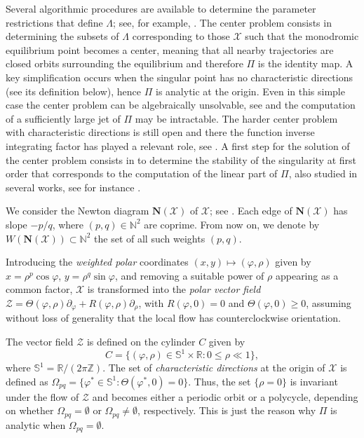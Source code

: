 \documentclass[12pt]{amsart}
\begin{document}
Several algorithmic procedures are available to determine the parameter restrictions that define $\Lambda$; see, for example, \cite{Dum, Ar, AGR,AGR2, GGGrau}. The center problem consists in determining the subsets of $\Lambda$ corresponding to those $\mathcal{X}$ such that the  monodromic equilibrium point becomes a center, meaning that all nearby trajectories are closed orbits surrounding the equilibrium and therefore $\Pi$ is the identity map. A key simplification occurs when the singular point has no characteristic directions (see its definition below), hence $\Pi$ is analytic at the origin. Even in this simple case the center problem can be algebraically  unsolvable, see \cite{ADGG,BRY,CYZ,Ga-Ma,Ilyashenko-2,G1,GM,LWX,RS,TLZ} and the computation of a sufficiently large jet of $\Pi$ may be intractable. The harder center problem with characteristic directions is still open and there the function inverse integrating factor has played a relevant role, see \cite{AGG,GaGiGr,Ga-Gi,GaGi2,GS}. A first step for the solution of the center problem consists in to determine the stability of the singularity at first order that corresponds to the computation of the linear part of $\Pi$, also studied in several works, see for instance \cite{GaGi5,Ma,Me-2,Me-3}.

We consider the Newton diagram $\mathbf{N}(\mathcal{X})$ of $\mathcal{X}$; see \cite{Bruno, AGR}. Each edge of $\mathbf{N}(\mathcal{X})$ has slope $-p/q$, where $(p,q) \in \mathbb{N}^2$ are coprime. From now on, we denote by $W(\mathbf{N}(\mathcal{X})) \subset \mathbb{N}^2$ the set of all such weights $(p,q)$.

Introducing the {\it weighted polar} coordinates $(x,y) \mapsto (\varphi, \rho)$ given by $x= \rho^p \cos\varphi$, $y = \rho^q \sin\varphi$, and removing a suitable power of $\rho$ appearing as a common factor, $\mathcal{X}$ is transformed into the {\it polar vector field} $\mathcal{Z} = \Theta(\varphi, \rho) \partial_\varphi + R(\varphi, \rho) \partial_\rho$, with
$R(\varphi, 0)=0$ and $\Theta(\varphi, 0) \geq 0$, assuming without loss of generality that the local flow has counterclockwise orientation.

The vector field $\mathcal{Z}$ is defined on the cylinder $C$ given by
\begin{equation}\label{cilinder}
C =  \{ (\varphi, \rho) \in \mathbb{S}^1 \times \mathbb{R} :  0 \leq \rho \ll 1 \},
\end{equation}
where $\mathbb{S}^1 = \mathbb{R}/ (2 \pi \mathbb{Z})$. The set of {\it characteristic directions} at the origin of $\mathcal{X}$ is defined as
$\Omega_{pq} = \{ \varphi^* \in \mathbb{S}^1 : \Theta(\varphi^*, 0) = 0 \}$. Thus, the set $\{\rho=0 \}$ is invariant under the flow of $\mathcal{Z}$ and becomes either a periodic orbit or a polycycle, depending on whether $\Omega_{pq} = \emptyset$ or $\Omega_{pq} \neq \emptyset$, respectively. This is just the reason why $\Pi$ is analytic when $\Omega_{pq} = \emptyset$.
\newline
\end{document}
